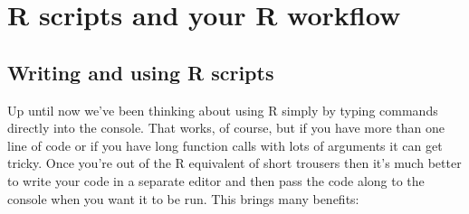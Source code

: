 \documentclass[
]{book}
\begin{document}
\hypertarget{r-scripts-and-your-r-workflow}{%
\chapter{R scripts and your R workflow}\label{r-scripts-and-your-r-workflow}}

\hypertarget{writing-and-using-r-scripts}{%
\section{Writing and using R scripts}\label{writing-and-using-r-scripts}}

Up until now we've been thinking about using R simply by typing commands directly into the console. That works, of course, but if you have more than one line of code or if you have long function calls with lots of arguments it can get tricky. Once you're out of the R equivalent of short trousers then it's much better to write your code in a separate editor and then pass the code along to the console when you want it to be run. This brings many benefits:
\end{document}
